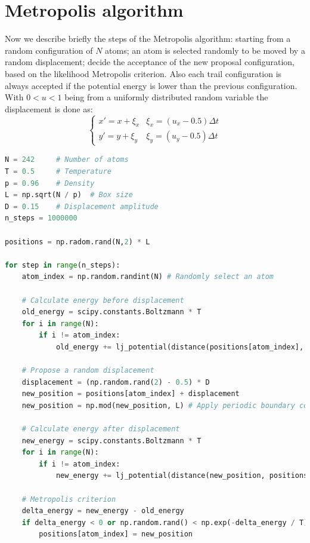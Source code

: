 \documentclass{article}
\begin{document}
\section{Metropolis algorithm}
Now we describe briefly the steps of the Metropolis algorithm: starting from a random configuration of $N$ atoms; an atom is selected randomly to be moved by a random displacement; decide the acceptance of the new proposal configuration, based on the likelihood Metropolis criterion. 
Also each trail configuration is always accepted if the potential energy is lower than the previous configuration. With $0<u<1$ being from a uniformly distributed random variable the displacement is done as:
\begin{equation}
    \begin{cases}
        x'=x+\xi_x&\xi_x=(u_x-0.5)\Delta t\\
        y'=y+\xi_y&\xi_y=(u_y-0.5)\Delta t
    \end{cases}
\end{equation}
\begin{lstlisting}[language=Python]
N = 242     # Number of atoms
T = 0.5     # Temperature
p = 0.96    # Density
L = np.sqrt(N / p)  # Box size
D = 0.15    # Displacement amplitude
n_steps = 1000000

positions = np.radom.rand(N,2) * L

for step in range(n_steps):
    atom_index = np.random.randint(N) # Randomly select an atom
    
    # Calculate energy before displacement
    old_energy = scipy.constants.Boltzmann * T
    for i in range(N):
        if i != atom_index:
            old_energy += lj_potential(distance(positions[atom_index], positions[i]))
    
    # Propose a random displacement
    displacement = (np.random.rand(2) - 0.5) * D
    new_position = positions[atom_index] + displacement
    new_position = np.mod(new_position, L) # Apply periodic boundary conditions

    # Calculate energy after displacement
    new_energy = scipy.constants.Boltzmann * T
    for i in range(N):
        if i != atom_index:
            new_energy += lj_potential(distance(new_position, positions[i]))
    
    # Metropolis criterion
    delta_energy = new_energy - old_energy
    if delta_energy < 0 or np.random.rand() < np.exp(-delta_energy / T):
        positions[atom_index] = new_position
\end{lstlisting}
\end{document}
